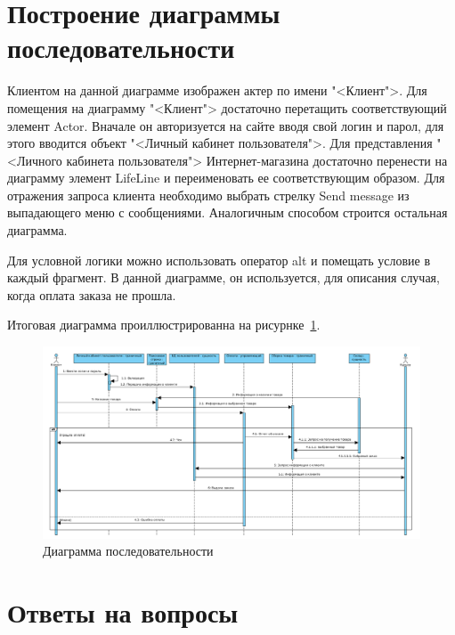 \section{Построение диаграммы последовательности}
Клиентом на данной диаграмме изображен актер по имени "<Клиент">.
Для помещения на диаграмму "<Клиент"> достаточно перетащить
соответствующий элемент Actor.
Вначале он авторизуется на сайте вводя свой логин и парол, для этого
вводится объект "<Личный кабинет пользователя">.
Для представления "<Личного кабинета пользователя"> Интернет-магазина
достаточно перенести на диаграмму элемент LifeLine и переименовать ее
соответствующим образом.
Для отражения запроса клиента необходимо выбрать
стрелку Send message из выпадающего меню с сообщениями.
Аналогичным способом строится остальная диаграмма.\par
Для условной логики можно использовать оператор alt и помещать
условие в каждый фрагмент. В данной диаграмме, он используется, для
описания случая, когда оплата заказа не прошла.\par
Итоговая диаграмма проиллюстрированна на рисурнке~\ref{fig:sequence}.

\begin{figure}[h!tp]
	\centering
	\includegraphics[width=1\textwidth]{Screenshot from 2023-03-18 17-29-36.png}
	\caption{Диаграмма последовательности}
	\label{fig:sequence}
\end{figure}

\newpage

\section*{Ответы на вопросы}


